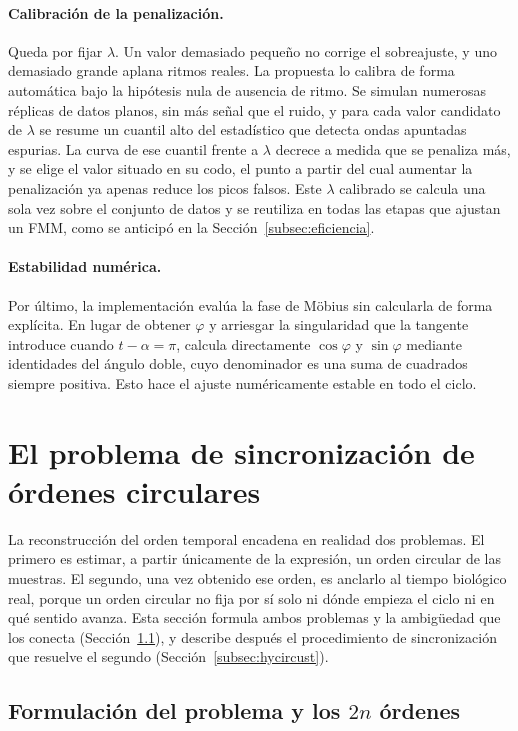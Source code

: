 \documentclass[12pt, a4paper]{report}
\begin{document}
\paragraph{Calibración de la penalización.} Queda por fijar $\lambda$. Un valor demasiado pequeño no corrige el sobreajuste, y uno demasiado grande aplana ritmos reales. La propuesta lo calibra de forma automática bajo la hipótesis nula de ausencia de ritmo. Se simulan numerosas réplicas de datos planos, sin más señal que el ruido, y para cada valor candidato de $\lambda$ se resume un cuantil alto del estadístico que detecta ondas apuntadas espurias. La curva de ese cuantil frente a $\lambda$ decrece a medida que se penaliza más, y se elige el valor situado en su codo, el punto a partir del cual aumentar la penalización ya apenas reduce los picos falsos. Este $\lambda$ calibrado se calcula una sola vez sobre el conjunto de datos y se reutiliza en todas las etapas que ajustan un FMM, como se anticipó en la Sección~\ref{subsec:eficiencia}.

\paragraph{Estabilidad numérica.} Por último, la implementación evalúa la fase de Möbius sin calcularla de forma explícita. En lugar de obtener $\varphi$ y arriesgar la singularidad que la tangente introduce cuando $t-\alpha=\pi$, calcula directamente $\cos\varphi$ y $\sin\varphi$ mediante identidades del ángulo doble, cuyo denominador es una suma de cuadrados siempre positiva. Esto hace el ajuste numéricamente estable en todo el ciclo.

\section{El problema de sincronización de órdenes circulares}
\label{sec:sincronizacion}

La reconstrucción del orden temporal encadena en realidad dos problemas. El primero es estimar, a partir únicamente de la expresión, un orden circular de las muestras. El segundo, una vez obtenido ese orden, es anclarlo al tiempo biológico real, porque un orden circular no fija por sí solo ni dónde empieza el ciclo ni en qué sentido avanza. Esta sección formula ambos problemas y la ambigüedad que los conecta (Sección~\ref{subsec:2n-ordenes}), y describe después el procedimiento de sincronización que resuelve el segundo (Sección~\ref{subsec:hycircust}).

\subsection{Formulación del problema y los $2n$ órdenes}
\label{subsec:2n-ordenes}
\end{document}
